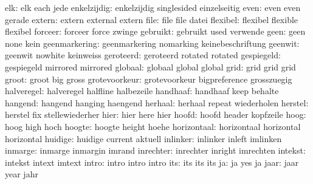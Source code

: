                 elk:  elk                  each                jede
        enkelzijdig:  enkelzijdig          singlesided         einzelseitig
               even:  even                 even                gerade
             extern:  extern               external            extern
               file:  file                 file                datei
           flexibel:  flexibel             flexible            flexibel
            forceer:  forceer              force               zwinge
           gebruikt:  gebruikt             used                verwende
               geen:  geen                 none                kein
      geenmarkering:  geenmarkering        nomarking           keinebeschriftung
            geenwit:  geenwit              nowhite             keinweiss
          geroteerd:  geroteerd            rotated             rotated  %
         gespiegeld:  gespiegeld           mirrored            mirrored %
            globaal:  globaal              global              global
               grid:  grid                 grid                grid %
              groot:  groot                big                 gross
      grotevoorkeur:  grotevoorkeur        bigpreference       grosszuegig
         halveregel:  halveregel           halfline            halbezeile %
           handhaaf:  handhaaf             keep                behalte
            hangend:  hangend              hanging             haengend
            herhaal:  herhaal              repeat              wiederholen
            herstel:  herstel              fix                 stellewiederher
               hier:  hier                 here                hier
              hoofd:  hoofd                header              kopfzeile
               hoog:  hoog                 high                hoch
             hoogte:  hoogte               height              hoehe
        horizontaal:  horizontaal          horizontal          horizontal
            huidige:  huidige              current             aktuell
           inlinker:  inlinker             inleft              imlinken
            inmarge:  inmarge              inmargin            imrand
          inrechter:  inrechter            inright             imrechten
            intekst:  intekst              intext              imtext
              intro:  intro                intro               intro
                its:  its                  its                 its
                 ja:  ja                   yes                 ja
               jaar:  jaar                 year                jahr
